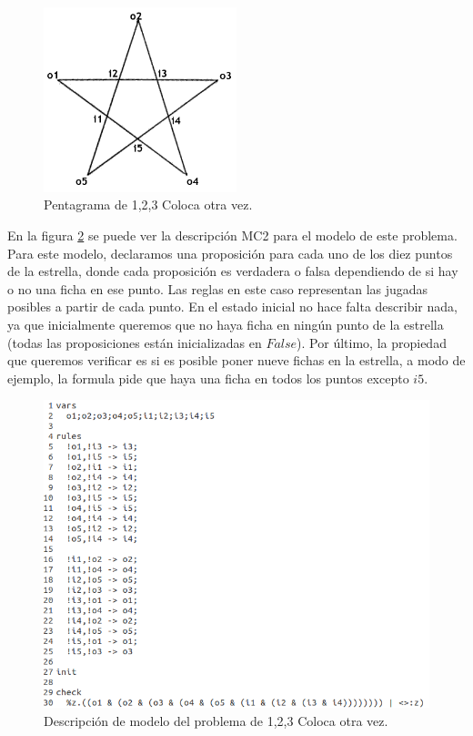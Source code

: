 \begin{figure}[H]
  \centering
  \includegraphics[width=0.5\textwidth]{Figures/pentagram.png}
  \caption{Pentagrama de 1,2,3 Coloca otra vez.}
  \label{fig:pentagrama}
\end{figure}

\noindent En la figura \ref{fig:estrella} se puede ver la descripción MC2 para el modelo de este problema. Para este modelo, declaramos una proposición para cada uno de los diez puntos de la estrella, donde cada proposición es verdadera o falsa dependiendo de si hay o no una ficha en ese punto. Las reglas en este caso representan las jugadas posibles a partir de cada punto. En el estado inicial no hace falta describir nada, ya que inicialmente queremos que no haya ficha en ningún punto de la estrella (todas las proposiciones están inicializadas en $False$). Por último, la propiedad que queremos verificar es si es posible poner nueve fichas en la estrella, a modo de ejemplo, la formula pide que haya una ficha en todos los puntos excepto $i5$.

\begin{figure}[H]
  \centering
  \includegraphics[width=1\textwidth]{Figures/estrella.png}
  \caption{Descripción de modelo del problema de 1,2,3 Coloca otra vez.}
  \label{fig:estrella}
\end{figure}


